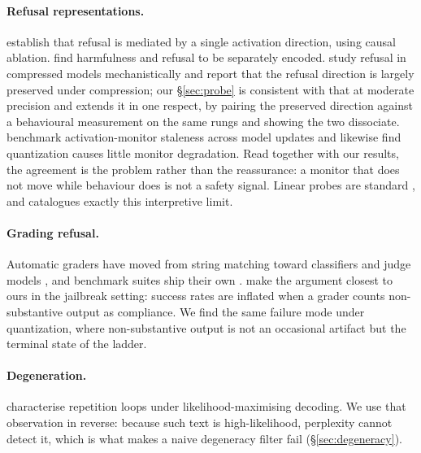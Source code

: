 \documentclass[11pt,a4paper]{article}
\begin{document}
\paragraph{Refusal representations.} \citet{arditi2024refusal} establish that
refusal is mediated by a single activation direction, using causal ablation.
\citet{zhao2025harmfulness} find harmfulness and refusal to be separately
encoded. \citet{chhabra2025refusal} study refusal in compressed models
mechanistically and report that the refusal direction is largely preserved under
compression; our \S\ref{sec:probe} is consistent with that at moderate precision
and extends it in one respect, by pairing the preserved direction against a
behavioural measurement on the same rungs and showing the two dissociate.
\citet{duan2026monitors} benchmark activation-monitor staleness across model
updates and likewise find quantization causes little monitor degradation. Read
together with our results, the agreement is the problem rather than the
reassurance: a monitor that does not move while behaviour does is not a safety
signal. Linear probes are standard \citep{alain2017probing}, and
\citet{belinkov2022probing} catalogues exactly this interpretive limit.

\paragraph{Grading refusal.} Automatic graders have moved from string matching
toward classifiers and judge models
\citep{inan2023llamaguard,ghosh2024aegis,zheng2023judging}, and benchmark suites
ship their own \citep{mazeika2024harmbench}. \citet{souly2024strongreject} make
the argument closest to ours in the jailbreak setting: success rates are inflated
when a grader counts non-substantive output as compliance. We find the same
failure mode under quantization, where non-substantive output is not an
occasional artifact but the terminal state of the ladder.

\paragraph{Degeneration.} \citet{holtzman2020degeneration} characterise
repetition loops under likelihood-maximising decoding. We use that observation in
reverse: because such text is high-likelihood, perplexity cannot detect it, which
is what makes a naive degeneracy filter fail (\S\ref{sec:degeneracy}).

\end{document}
